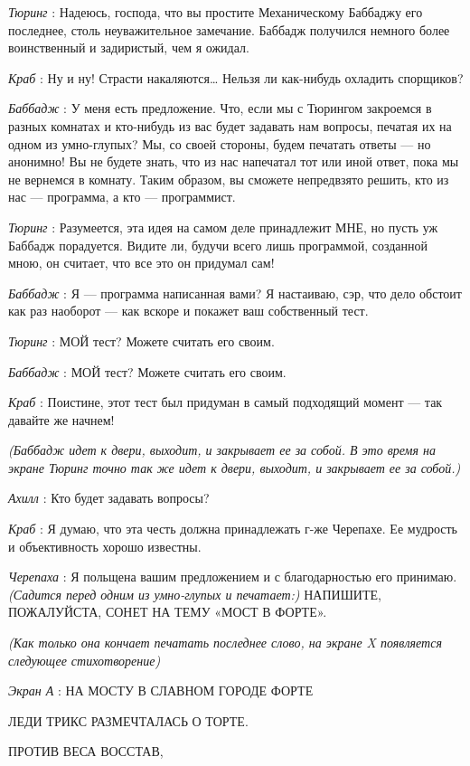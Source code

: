 \emph{Тюринг} : Надеюсь, господа, что вы простите Механическому Баббаджу его последнее, столь неуважительное замечание. Баббадж получился немного более воинственный и задиристый, чем я ожидал.

\emph{Краб} : Ну и ну! Страсти накаляются\ldots{} Нельзя ли как-нибудь охладить спорщиков?

\emph{Баббадж} : У меня есть предложение. Что, если мы с Тюрингом закроемся в разных комнатах и кто-нибудь из вас будет задавать нам вопросы, печатая их на одном из умно-глупых? Мы, со своей стороны, будем печатать ответы --- но анонимно! Вы не будете знать, что из нас напечатал тот или иной ответ, пока мы не вернемся в комнату. Таким образом, вы сможете непредвзято решить, кто из нас --- программа, а кто --- программист.

\emph{Тюринг} : Разумеется, эта идея на самом деле принадлежит МНЕ, но пусть уж Баббадж порадуется. Видите ли, будучи всего лишь программой, созданной мною, он считает, что все это он придумал сам!

\emph{Баббадж} : Я --- программа написанная вами? Я настаиваю, сэр, что дело обстоит как раз наоборот --- как вскоре и покажет ваш собственный тест.

\emph{Тюринг} : МОЙ тест? Можете считать его своим.

\emph{Баббадж} : МОЙ тест? Можете считать его своим.

\emph{Краб} : Поистине, этот тест был придуман в самый подходящий момент --- так давайте же начнем!

\emph{(Баббадж идет к двери, выходит, и закрывает ее за собой. В это время на экране Тюринг точно так же идет к двери, выходит, и закрывает ее за собой.)}

\emph{Ахилл} : Кто будет задавать вопросы?

\emph{Краб} : Я думаю, что эта честь должна принадлежать г-же Черепахе. Ее мудрость и объективность хорошо известны.

\emph{Черепаха} : Я польщена вашим предложением и с благодарностью его принимаю. \emph{(Садится перед одним из умно-глупых и печатает:)} НАПИШИТЕ, ПОЖАЛУЙСТА, СОНЕТ НА ТЕМУ «МОСТ В ФОРТЕ».

\emph{(Как только она кончает печатать последнее слово, на экране X появляется следующее стихотворение)}

\emph{Экран А} : НА МОСТУ В СЛАВНОМ ГОРОДЕ ФОРТЕ

ЛЕДИ ТРИКС РАЗМЕЧТАЛАСЬ О ТОРТЕ.

ПРОТИВ ВЕСА ВОССТАВ,

